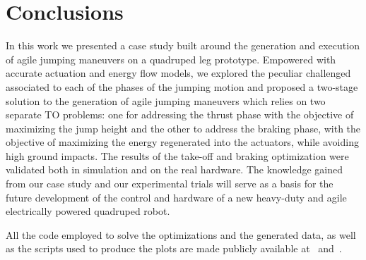 \section{Conclusions}\label{sec:conclusions}
In this work we presented a case study built around the generation and execution of agile jumping maneuvers on a quadruped leg prototype.  
Empowered with accurate actuation and energy flow models, we explored the peculiar challenged associated to each of the phases of the jumping motion and proposed a two-stage solution to the generation of agile jumping maneuvers which relies on two separate TO problems: one for addressing the thrust phase with the objective of maximizing the jump height and the other to address the braking phase, with the objective of maximizing the energy regenerated into the actuators, while avoiding high ground impacts.
The results of the take-off and braking optimization were validated both in simulation and on the real hardware.
The knowledge gained from our case study and our experimental trials will serve as a basis for the future development of the control and hardware of a new heavy-duty and agile electrically powered quadruped robot. 

All the code employed to solve the optimizations and the generated data, as well as the scripts used to produce the plots are made publicly available at~\cite{url::awesome_leg_repo} and~\cite{url::data_link}.
